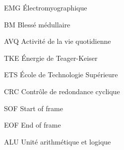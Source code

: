 \documentclass[letterpaper, twoside, 12pt, memoire, creativecommons, hyperref]{thETS}
\begin{document}
\tableofcontents

\listoftables

\listoffigures

\begin{listofabbr}[3cm]
\item [EMG] Électromyographique
\item [BM] Blessé médullaire
\item [AVQ] Activité de la vie quotidienne
\item [TKE] Énergie de Teager-Keiser
\item [ETS] École de Technologie Supérieure
\item [CRC] Contrôle de redondance cyclique
\item [SOF] Start of frame
\item [EOF] End of frame
\item [ALU] Unité arithmétique et logique

\end{listofabbr}
\end{document}
